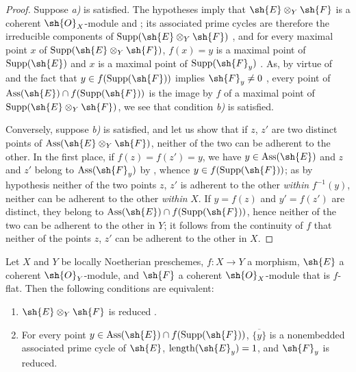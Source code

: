 \begin{proof}
Suppose \emph{a)} is satisfied.
The hypotheses imply that $\sh{E}\otimes_Y\sh{F}$ is a coherent $\sh{O}_X$-module  and ; its associated prime cycles are therefore the irreducible components of $\operatorname{Supp}(\sh{E}\otimes_Y\sh{F})$ , and for every maximal point $x$ of $\operatorname{Supp}(\sh{E}\otimes_Y\sh{F})$, $f(x)=y$ is a maximal point of $\operatorname{Supp}(\sh{E})$ and $x$ is a maximal point of $\operatorname{Supp}(\sh{F}_y)$ .
As, by virtue of  and the fact that $y\in f(\operatorname{Supp}(\sh{F}))$ implies $\sh{F}_y\neq 0$ , every point of $\operatorname{Ass}(\sh{E})\cap f(\operatorname{Supp}(\sh{F}))$ is the image by $f$ of a maximal point of $\operatorname{Supp}(\sh{E}\otimes_Y\sh{F})$, we see that condition \emph{b)} is satisfied.

Conversely, suppose \emph{b)} is satisfied, and let us show that if $z$, $z'$ are two distinct points of $\operatorname{Ass}(\sh{E}\otimes_Y\sh{F})$, neither of the two can be adherent to the other.
In the first place, if $f(z)=f(z')=y$, we have $y\in\operatorname{Ass}(\sh{E})$ and $z$ and $z'$ belong to $\operatorname{Ass}(\sh{F}_y)$ by , whence $y\in f(\operatorname{Supp}(\sh{F}))$; as by hypothesis neither of the two points $z$, $z'$ is adherent to the other \emph{within} $f^{-1}(y)$, neither can be adherent to the other \emph{within} $X$.
If $y=f(z)$ and $y'=f(z')$ are distinct, they belong to $\operatorname{Ass}(\sh{E})\cap f(\operatorname{Supp}(\sh{F}))$, hence neither of the two can be adherent to the other in $Y$; it follows from the continuity of $f$ that neither of the points $z$, $z'$ can be adherent to the other in $X$.
\end{proof}

\begin{proposition}[3.3.4]
\label{IV.3.3.4}
Let $X$ and $Y$ be locally Noetherian preschemes, $f:X\to Y$ a morphism, $\sh{E}$ a coherent $\sh{O}_Y$-module, and $\sh{F}$ a coherent $\sh{O}_X$-module that is $f$-flat.
Then the following conditions are equivalent:
\begin{enumerate}
  \item[\emph{a)}] $\sh{E}\otimes_Y\sh{F}$ is reduced .
  \item[\emph{b)}] For every point $y\in\operatorname{Ass}(\sh{E})\cap f(\operatorname{Supp}(\sh{F}))$, $\overline{\{y\}}$ is a nonembedded associated prime cycle of $\sh{E}$, $\operatorname{length}(\sh{E}_y)=1$, and $\sh{F}_y$ is reduced.
\end{enumerate}
\end{proposition}

